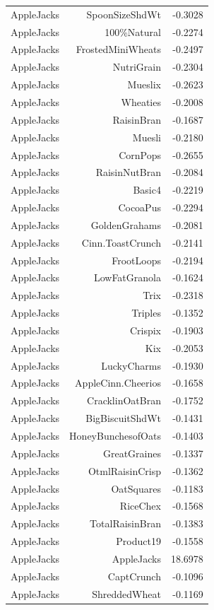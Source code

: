 \begin{longtable}{@{}lrr@{}}
AppleJacks & SpoonSizeShdWt & -0.3028 \\
AppleJacks & 100\%Natural & -0.2274 \\
AppleJacks & FrostedMiniWheats & -0.2497 \\
AppleJacks & NutriGrain & -0.2304 \\
AppleJacks & Mueslix & -0.2623 \\
AppleJacks & Wheaties & -0.2008 \\
AppleJacks & RaisinBran & -0.1687 \\
AppleJacks & Muesli & -0.2180 \\
AppleJacks & CornPops & -0.2655 \\
AppleJacks & RaisinNutBran & -0.2084 \\
AppleJacks & Basic4 & -0.2219 \\
AppleJacks & CocoaPus & -0.2294 \\
AppleJacks & GoldenGrahams & -0.2081 \\
AppleJacks & Cinn.ToastCrunch & -0.2141 \\
AppleJacks & FrootLoops & -0.2194 \\
AppleJacks & LowFatGranola & -0.1624 \\
AppleJacks & Trix & -0.2318 \\
AppleJacks & Triples & -0.1352 \\
AppleJacks & Crispix & -0.1903 \\
AppleJacks & Kix & -0.2053 \\
AppleJacks & LuckyCharms & -0.1930 \\
AppleJacks & AppleCinn.Cheerios & -0.1658 \\
AppleJacks & CracklinOatBran & -0.1752 \\
AppleJacks & BigBiscuitShdWt & -0.1431 \\
AppleJacks & HoneyBunchesofOats & -0.1403 \\
AppleJacks & GreatGraines & -0.1337 \\
AppleJacks & OtmlRaisinCrisp & -0.1362 \\
AppleJacks & OatSquares & -0.1183 \\
AppleJacks & RiceChex & -0.1568 \\
AppleJacks & TotalRaisinBran & -0.1383 \\
AppleJacks & Product19 & -0.1558 \\
AppleJacks & AppleJacks & 18.6978 \\
AppleJacks & CaptCrunch & -0.1096 \\
AppleJacks & ShreddedWheat & -0.1169 \\

\end{longtable}
